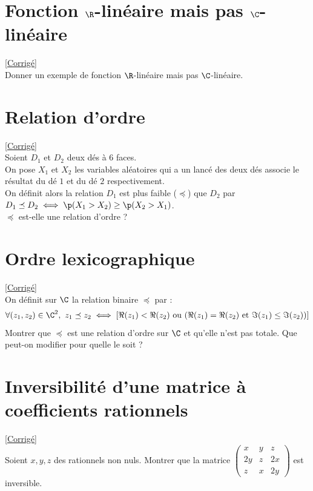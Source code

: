\documentclass[8pt]{book}
\begin{document}
\section{Fonction $\R$-linéaire mais pas $\C$-linéaire }
\label{Fonction R linéaire mais pas C linéaire}
\textcolor{blue}{\hyperref[Fonction R linéaire mais pas C linéaire corrigé]{[Corrigé]}}\\
Donner un exemple de fonction $\R$-linéaire mais pas $\C$-linéaire.

\section{Relation d'ordre }
\label{Relation d'ordre}
\textcolor{blue}{\hyperref[Relation d'ordre corrigé]{[Corrigé]}}\\
Soient $D_1$ et $D_2$ deux dés à $6$ faces.\\
On pose $X_1$ et $X_2$ les variables aléatoires qui a un lancé des deux dés associe le résultat du dé $1$ et du dé $2$ respectivement.\\
On définit alors la relation $D_1$ est plus faible ($\preceq$) que $D_2$ par $D_1\preceq D_2\iff \p(X_1>X_2)\geq \p(X_2>X_1)$.\\
$\preceq$ est-elle une relation d'ordre ?

\section{Ordre lexicographique }
\label{Ordre lexicographique}
\textcolor{blue}{\hyperref[Ordre lexicographique corrigé]{[Corrigé]}}\\
On définit sur $\C$ la relation binaire $\preceq$ par :
$$\forall (z_1,z_2)\in \C^2,\ z_1\preceq z_2\iff [\Re(z_1)<\Re(z_2)\text{ ou } (\Re(z_1)=\Re(z_2)\text{ et }\Im(z_1)\leq\Im(z_2))]$$
Montrer que $\preceq$ est une relation d'ordre sur $\C$ et qu'elle n'est pas totale. Que peut-on modifier pour quelle le soit ?

\section{Inversibilité d'une matrice à coefficients rationnels }
\label{Inversibilité d'une matrice à coefficients rationnels}
\textcolor{blue}{\hyperref[Inversibilité d'une matrice à coefficients rationnels corrigé]{[Corrigé]}}\\
Soient $x,y,z$ des rationnels non nuls. Montrer que la matrice $\begin{pmatrix}
	x&y&z\\
	2y&z&2x\\
	z&x&2y
\end{pmatrix}$ est inversible.
\end{document}
